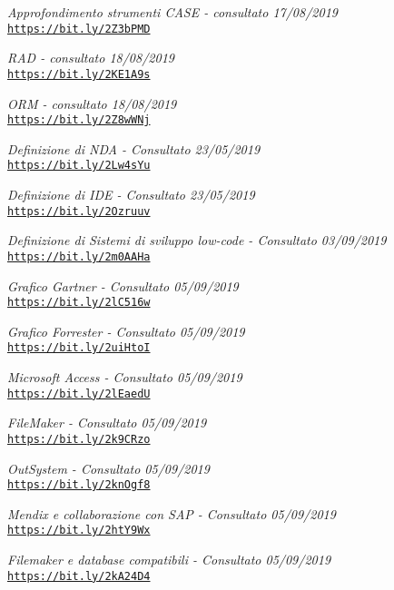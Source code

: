 \begin{thebibliography}{99}
	\bibitem{[12]} \label{bib12}
	\textit{Approfondimento strumenti CASE - consultato 17/08/2019}\\
	\texttt{\url{https://bit.ly/2Z3bPMD}}		


	\bibitem{[13]} \label{bib13}
	\textit{RAD - consultato 18/08/2019}\\
	\texttt{\url{https://bit.ly/2KE1A9s}}		
	
	
	\bibitem{[14]} \label{bib14}
	\textit{ORM - consultato 18/08/2019}\\
	\texttt{\url{https://bit.ly/2Z8wWNj}}		

	
	\bibitem{[15]} \label{bib15}
	\textit{Definizione di NDA - Consultato 23/05/2019}\\
	\texttt{\url{https://bit.ly/2Lw4sYu}}
	
	\bibitem{[16]} \label{bib16}
	\textit{Definizione di IDE - Consultato 23/05/2019}\\
	\texttt{\url{https://bit.ly/2Ozruuv}}
	
	\bibitem{[17]} \label{bib17}
	\textit{Definizione di Sistemi di sviluppo low-code - Consultato 03/09/2019}\\
	\texttt{\url{https://bit.ly/2m0AAHa}}
	
	\bibitem{[18]} \label{bib18}
	\textit{Grafico Gartner - Consultato 05/09/2019}\\
	\texttt{\url{https://bit.ly/2lC516w}}
	
	\bibitem{[19]} \label{bib19}
	\textit{Grafico Forrester - Consultato 05/09/2019}\\
	\texttt{\url{https://bit.ly/2uiHtoI}}
	
	\bibitem{[20]} \label{bib20}
	\textit{Microsoft Access - Consultato 05/09/2019}\\
	\texttt{\url{https://bit.ly/2lEaedU}}
	
	\bibitem{[21]} \label{bib21}
	\textit{FileMaker - Consultato 05/09/2019}\\
	\texttt{\url{https://bit.ly/2k9CRzo}}
	
	\bibitem{[22]} \label{bib22}
	\textit{OutSystem - Consultato 05/09/2019}\\
	\texttt{\url{https://bit.ly/2knOgf8}}
	
	\bibitem{[23]} \label{bib23}
	\textit{Mendix e collaborazione con SAP - Consultato 05/09/2019}\\
	\texttt{\url{https://bit.ly/2htY9Wx}}
	
	\bibitem{[24]} \label{bib24}
	\textit{Filemaker e database compatibili - Consultato 05/09/2019}\\
	\texttt{\url{https://bit.ly/2kA24D4}}
	

\end{thebibliography}
